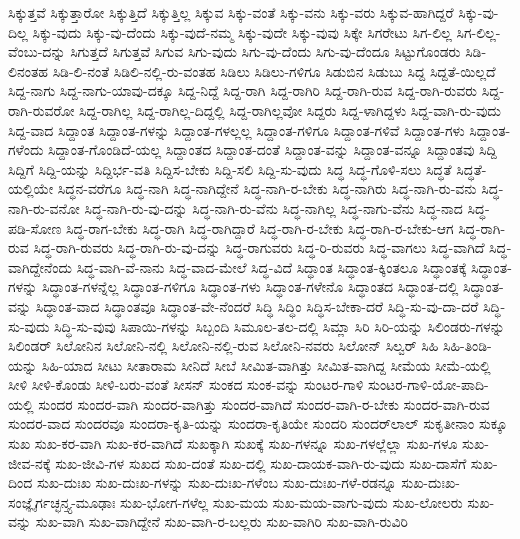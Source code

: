 {ಸಿಕ್ಕುತ್ತವೆ
ಸಿಕ್ಕುತ್ತಾರೋ
ಸಿಕ್ಕುತ್ತಿದೆ
ಸಿಕ್ಕುತ್ತಿಲ್ಲ
ಸಿಕ್ಕುವ
ಸಿಕ್ಕು-ವಂತೆ
ಸಿಕ್ಕು-ವನು
ಸಿಕ್ಕು-ವರು
ಸಿಕ್ಕುವ-ಹಾಗಿದ್ದರೆ
ಸಿಕ್ಕು-ವು-ದಿಲ್ಲ
ಸಿಕ್ಕು-ವುದು
ಸಿಕ್ಕು-ವು-ದೆಂದು
ಸಿಕ್ಕು-ವುದೆ-ನಮ್ಮ
ಸಿಕ್ಕು-ವುದೇ
ಸಿಕ್ಕು-ವುವು
ಸಿಕ್ಕೇ
ಸಿಗರೇಟು
ಸಿಗ-ಲಿಲ್ಲ
ಸಿಗ-ಲಿಲ್ಲ-ವೆಂಬು-ದನ್ನು
ಸಿಗುತ್ತದೆ
ಸಿಗುತ್ತವೆ
ಸಿಗುವ
ಸಿಗು-ವುದು
ಸಿಗು-ವು-ದೆಂದು
ಸಿಗು-ವು-ದೆಂದೂ
ಸಿಟ್ಟುಗೊಂಡರು
ಸಿಡಿ-ಲಿನಂತಹ
ಸಿಡಿ-ಲಿ-ನಂತೆ
ಸಿಡಿಲಿ-ನಲ್ಲಿ-ರು-ವಂತಹ
ಸಿಡಿಲು
ಸಿಡಿಲು-ಗಳಿಗೂ
ಸಿಡುಬಿನ
ಸಿಡುಬು
ಸಿದ್ದ
ಸಿದ್ದತೆ-ಯಿಲ್ಲದೆ
ಸಿದ್ದ-ನಾಗು
ಸಿದ್ದ-ನಾಗು-ಯಾವು-ದಕ್ಕೂ
ಸಿದ್ದ-ನಿದ್ದೆ
ಸಿದ್ದ-ರಾಗಿ
ಸಿದ್ದ-ರಾಗಿರಿ
ಸಿದ್ದ-ರಾಗಿ-ರುವ
ಸಿದ್ದ-ರಾಗಿ-ರುವರು
ಸಿದ್ದ-ರಾಗಿ-ರುವರೋ
ಸಿದ್ದ-ರಾಗಿಲ್ಲ
ಸಿದ್ದ-ರಾಗಿಲ್ಲ-ದಿದ್ದಲ್ಲಿ
ಸಿದ್ದ-ರಾಗಿಲ್ಲವೋ
ಸಿದ್ದರು
ಸಿದ್ದ-ಳಾಗಿದ್ದಳು
ಸಿದ್ದ-ವಾಗಿ-ರು-ವುದು
ಸಿದ್ದ-ವಾದ
ಸಿದ್ದಾಂತ
ಸಿದ್ದಾಂತ-ಗಳನ್ನು
ಸಿದ್ದಾಂತ-ಗಳಲ್ಲಲ್ಲ
ಸಿದ್ದಾಂತ-ಗಳಿಗೂ
ಸಿದ್ದಾಂತ-ಗಳಿವೆ
ಸಿದ್ದಾಂತ-ಗಳು
ಸಿದ್ದಾಂತ-ಗಳೆಂದು
ಸಿದ್ದಾಂತ-ಗೊಂಡಿದೆ-ಯಲ್ಲ
ಸಿದ್ದಾಂತದ
ಸಿದ್ದಾಂತ-ದಂತೆ
ಸಿದ್ದಾಂತ-ವನ್ನು
ಸಿದ್ದಾಂತ-ವನ್ನೂ
ಸಿದ್ದಾಂತವು
ಸಿದ್ದಿ
ಸಿದ್ದಿಗೆ
ಸಿದ್ದಿ-ಯನ್ನು
ಸಿದ್ದಿರ್ಭ-ವತಿ
ಸಿದ್ದಿಸ-ಬೇಕು
ಸಿದ್ದಿ-ಸಲಿ
ಸಿದ್ದಿ-ಸು-ವುದು
ಸಿದ್ಧ
ಸಿದ್ಧ-ಗೊಳಿ-ಸಲು
ಸಿದ್ಧತೆ
ಸಿದ್ಧತೆ-ಯಲ್ಲಿಯೇ
ಸಿದ್ಧನ-ವರೆಗೂ
ಸಿದ್ಧ-ನಾಗಿ
ಸಿದ್ಧ-ನಾಗಿದ್ದೇನೆ
ಸಿದ್ಧ-ನಾಗಿ-ರ-ಬೇಕು
ಸಿದ್ಧ-ನಾಗಿರು
ಸಿದ್ಧ-ನಾಗಿ-ರು-ವನು
ಸಿದ್ಧ-ನಾಗಿ-ರು-ವನೋ
ಸಿದ್ಧ-ನಾಗಿ-ರು-ವು-ದನ್ನು
ಸಿದ್ಧ-ನಾಗಿ-ರು-ವೆನು
ಸಿದ್ಧ-ನಾಗಿಲ್ಲ
ಸಿದ್ಧ-ನಾಗು-ವೆನು
ಸಿದ್ಧ-ನಾದ
ಸಿದ್ಧ-ಪಡಿ-ಸೋಣ
ಸಿದ್ಧ-ರಾಗ-ಬೇಕು
ಸಿದ್ಧ-ರಾಗಿ
ಸಿದ್ಧ-ರಾಗಿದ್ದಾರೆ
ಸಿದ್ಧ-ರಾಗಿ-ರ-ಬೇಕು
ಸಿದ್ಧ-ರಾಗಿ-ರ-ಬೇಕು-ಆಗ
ಸಿದ್ಧ-ರಾಗಿ-ರುವ
ಸಿದ್ಧ-ರಾಗಿ-ರುವರು
ಸಿದ್ಧ-ರಾಗಿ-ರು-ವು-ದನ್ನು
ಸಿದ್ಧ-ರಾಗುವರು
ಸಿದ್ಧ-ರಿ-ರುವರು
ಸಿದ್ಧ-ವಾಗಲು
ಸಿದ್ಧ-ವಾಗಿದೆ
ಸಿದ್ಧ-ವಾಗಿದ್ದೇನೆಂದು
ಸಿದ್ಧ-ವಾಗಿ-ವೆ-ನಾನು
ಸಿದ್ಧ-ವಾದ-ಮೇಲೆ
ಸಿದ್ಧ-ವಿದೆ
ಸಿದ್ಧಾಂತ
ಸಿದ್ಧಾಂತ-ಕ್ಕಿಂತಲೂ
ಸಿದ್ಧಾಂತಕ್ಕೆ
ಸಿದ್ಧಾಂತ-ಗಳನ್ನು
ಸಿದ್ಧಾಂತ-ಗಳನ್ನೆಲ್ಲ
ಸಿದ್ಧಾಂತ-ಗಳಿಗೂ
ಸಿದ್ಧಾಂತ-ಗಳು
ಸಿದ್ಧಾಂತ-ಗಳೇನೊ
ಸಿದ್ಧಾಂತದ
ಸಿದ್ಧಾಂತ-ದಲ್ಲಿ
ಸಿದ್ಧಾಂತ-ವನ್ನು
ಸಿದ್ಧಾಂತ-ವಾದ
ಸಿದ್ಧಾಂತವೂ
ಸಿದ್ಧಾಂತ-ವೇ-ನೆಂದರೆ
ಸಿದ್ಧಿ
ಸಿದ್ಧಿಂ
ಸಿದ್ಧಿಸ-ಬೇಕಾ-ದರೆ
ಸಿದ್ಧಿ-ಸು-ವು-ದಾ-ದರೆ
ಸಿದ್ಧಿ-ಸು-ವುದು
ಸಿದ್ಧಿ-ಸು-ವುವು
ಸಿಪಾಯಿ-ಗಳನ್ನು
ಸಿಬ್ಬಂದಿ
ಸಿಮೂಲ-ತಲ-ದಲ್ಲಿ
ಸಿಮ್ಲಾ
ಸಿರಿ
ಸಿರಿ-ಯನ್ನು
ಸಿಲಿಂಡರು-ಗಳನ್ನು
ಸಿಲಿಂಡರ್‌
ಸಿಲೋನಿನ
ಸಿಲೋನಿ-ನಲ್ಲಿ
ಸಿಲೋನಿ-ನಲ್ಲಿ-ರುವ
ಸಿಲೋನಿ-ನವರು
ಸಿಲೋನ್
ಸಿಲ್ವರ್
ಸಿಹಿ
ಸಿಹಿ-ತಿಂಡಿ-ಯನ್ನು
ಸಿಹಿ-ಯಾದ
ಸೀಟು
ಸೀತಾರಾಮ
ಸೀನಿದೆ
ಸೀಬೆ
ಸೀಮಿತ-ವಾಗಿತ್ತು
ಸೀಮಿತ-ವಾಗಿದ್ದ
ಸೀಮೆಯ
ಸೀಮೆ-ಯಲ್ಲಿ
ಸೀಳಿ
ಸೀಳಿ-ಕೊಂಡು
ಸೀಳಿ-ಬರು-ವಂತೆ
ಸೀಸನ್
ಸುಂಕದ
ಸುಂಕ-ವನ್ನು
ಸುಂಟರ-ಗಾಳಿ
ಸುಂಟರ-ಗಾಳಿ-ಯೋ-ಪಾದಿ-ಯಲ್ಲಿ
ಸುಂದರ
ಸುಂದರ-ವಾಗಿ
ಸುಂದರ-ವಾಗಿತ್ತು
ಸುಂದರ-ವಾಗಿದೆ
ಸುಂದರ-ವಾಗಿ-ರ-ಬೇಕು
ಸುಂದರ-ವಾಗಿ-ರುವ
ಸುಂದರ-ವಾದ
ಸುಂದರವೂ
ಸುಂದರಾ-ಕೃತಿ-ಯನ್ನು
ಸುಂದರಾ-ಕೃತಿಯೇ
ಸುಂದರಿ
ಸುಂದರ್‌ಲಾಲ್
ಸುಕೃತೀನಾಂ
ಸುಕ್ಕೂ
ಸುಖ
ಸುಖ-ಕರ-ವಾಗಿ
ಸುಖ-ಕರ-ವಾಗಿದೆ
ಸುಖಕ್ಕಾಗಿ
ಸುಖಕ್ಕೆ
ಸುಖ-ಗಳನ್ನೂ
ಸುಖ-ಗಳಲ್ಲೆಲ್ಲಾ
ಸುಖ-ಗಳೂ
ಸುಖ-ಜೀವ-ನಕ್ಕೆ
ಸುಖ-ಜೀವಿ-ಗಳ
ಸುಖದ
ಸುಖ-ದಂತೆ
ಸುಖ-ದಲ್ಲಿ
ಸುಖ-ದಾಯಕ-ವಾಗಿ-ರು-ವುದು
ಸುಖ-ದಾಸೆಗೆ
ಸುಖ-ದಿಂದ
ಸುಖ-ದುಃಖ
ಸುಖ-ದುಃಖ-ಗಳನ್ನು
ಸುಖ-ದುಃಖ-ಗಳೆಂಬ
ಸುಖ-ದುಃಖ-ಗಳೆ-ರಡನ್ನೂ
ಸುಖ-ದುಃಖ-ಸಂಜ್ಞೈರ್ಗಚ್ಛನ್ತ್ಯ-ಮೂಢಾಃ
ಸುಖ-ಭೋಗ-ಗಳೆಲ್ಲ
ಸುಖ-ಮಯ
ಸುಖ-ಮಯ-ವಾಗು-ವುದು
ಸುಖ-ಲೋಲರು
ಸುಖ-ವನ್ನು
ಸುಖ-ವಾಗಿ
ಸುಖ-ವಾಗಿದ್ದೇನೆ
ಸುಖ-ವಾಗಿ-ರ-ಬಲ್ಲರು
ಸುಖ-ವಾಗಿರಿ
ಸುಖ-ವಾಗಿ-ರುವಿರಿ
}
